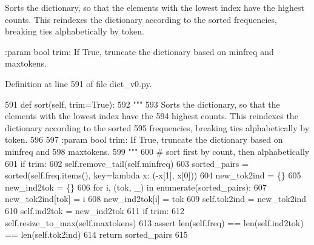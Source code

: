 \begin{DoxyVerb}Sorts the dictionary, so that the elements with the lowest index have the
highest counts. This reindexes the dictionary according to the sorted
frequencies, breaking ties alphabetically by token.

:param bool trim: If True, truncate the dictionary based on minfreq and
    maxtokens.
\end{DoxyVerb}
 

Definition at line 591 of file dict\+\_\+v0.\+py.


\begin{DoxyCode}
591     \textcolor{keyword}{def }sort(self, trim=True):
592         \textcolor{stringliteral}{"""}
593 \textcolor{stringliteral}{        Sorts the dictionary, so that the elements with the lowest index have the}
594 \textcolor{stringliteral}{        highest counts. This reindexes the dictionary according to the sorted}
595 \textcolor{stringliteral}{        frequencies, breaking ties alphabetically by token.}
596 \textcolor{stringliteral}{}
597 \textcolor{stringliteral}{        :param bool trim: If True, truncate the dictionary based on minfreq and}
598 \textcolor{stringliteral}{            maxtokens.}
599 \textcolor{stringliteral}{        """}
600         \textcolor{comment}{# sort first by count, then alphabetically}
601         \textcolor{keywordflow}{if} trim:
602             self.remove\_tail(self.minfreq)
603         sorted\_pairs = sorted(self.freq.items(), key=\textcolor{keyword}{lambda} x: (-x[1], x[0]))
604         new\_tok2ind = \{\}
605         new\_ind2tok = \{\}
606         \textcolor{keywordflow}{for} i, (tok, \_) \textcolor{keywordflow}{in} enumerate(sorted\_pairs):
607             new\_tok2ind[tok] = i
608             new\_ind2tok[i] = tok
609         self.tok2ind = new\_tok2ind
610         self.ind2tok = new\_ind2tok
611         \textcolor{keywordflow}{if} trim:
612             self.resize\_to\_max(self.maxtokens)
613         \textcolor{keyword}{assert} len(self.freq) == len(self.ind2tok) == len(self.tok2ind)
614         \textcolor{keywordflow}{return} sorted\_pairs
615 
\end{DoxyCode}
\mbox{\label{classparlai_1_1agents_1_1legacy__agents_1_1seq2seq_1_1dict__v0_1_1DictionaryAgent_a9e091c9b3daf9f5e7496f7aac6f473eb}} 
